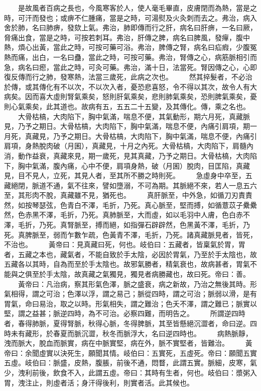 　　是故風者百病之長也，今風寒客於人，使人毫毛畢直，皮膚閉而為熱，當是之時，可汗而發也；或痹不仁腫痛，當是之時，可湯熨及火灸刺而去之。弗治，病入舍於肺，名曰肺痹，發欬上氣。弗治，肺即傳而行之肝，病名曰肝痹，一名曰厥，脅痛出食，當是之時，可按若刺耳。弗治，肝傳之脾，病名曰脾風，發癉，腹中熱，煩心出黃，當此之時，可按可藥可浴。弗治，脾傳之腎，病名曰疝瘕，少腹冤熱而痛，出白，一名曰蠱，當此之時，可按可藥。弗治，腎傳之心，病筋脈相引而急，病名曰瘛，當此之時，可灸可藥。弗治，滿十日，法當死。腎因傳之心，心即復反傳而行之肺，發寒熱，法當三歲死，此病之次也。
　　然其捽髮者，不必治於傳，或其傳化有不以次，不以次入者，憂恐悲喜怒，令不得以其次，故令人有大病矣。因而喜大虛則腎氣乘矣，怒則肝氣乘矣，悲則肺氣乘矣，恐則脾氣乘矣，憂則心氣乘矣，此其道也。故病有五，五五二十五變，及其傳化。傳，乘之名也。
　　大骨枯槁，大肉陷下，胸中氣滿，喘息不便，其氣動形，期六月死，真藏脈見，乃予之期日。大骨枯槁，大肉陷下，胸中氣滿，喘息不便，內痛引肩項，期一月死，真藏見，乃予之期日。大骨枯槁，大肉陷下，胸中氣滿，喘息不便，內痛引肩項，身熱脫肉破（月囷），真藏見，十月之內死。大骨枯槁，大肉陷下，肩髓內消，動作益衰，真藏來見，期一歲死，見其真藏，乃予之期日。大骨枯槁，大肉陷下，胸中氣滿，腹內痛，心中不便，肩項身熱，破（月囷）脫肉，目匡陷，真藏見，目不見人，立死，其見人者，至其所不勝之時則死。
　　急虛身中卒至，五藏絕閉，脈道不通，氣不往來，譬如墮溺，不可為期。其脈絕不來，若人一息五六至，其形肉不脫，真藏雖不見，猶死也。
　　真肝脈至，中外急，如循刀刃責責然，如按琴瑟弦，色青白不澤，毛折，乃死。真心脈至，堅而搏，如循薏苡子纍纍然，色赤黑不澤，毛折，乃死。真肺脈至，大而虛，如以毛羽中人膚，色白赤不澤，毛折，乃死。真腎脈至，搏而絕，如指彈石辟辟然，色黑黃不澤，毛折，乃死。真脾脈至，弱而乍數乍疏，色黃青不澤，毛折，乃死。諸真藏脈見者，皆死，不治也。
　　黃帝曰：見真藏曰死，何也。岐伯曰：五藏者，皆稟氣於胃，胃者，五藏之本也，藏氣者，不能自致於手太陰，必因於胃氣，乃至於手太陰也，故五藏各以其時，自為而至於手太陰也。故邪氣勝者，精氣衰也，故病甚者，胃氣不能與之俱至於手太陰，故真藏之氣獨見，獨見者病勝藏也，故曰死。帝曰：善。
　　黃帝曰：凡治病，察其形氣色澤，脈之盛衰，病之新故，乃治之無後其時。形氣相得，謂之可治；色澤以浮，謂之易己；脈從四時，謂之可治；脈弱以滑，是有胃氣，命曰易治，取之以時。形氣相失，謂之難治；色夭不澤，謂之難已；脈實以堅，謂之益甚；脈逆四時，為不可治。必察四難，而明告之。
　　所謂逆四時者，春得肺脈，夏得腎脈，秋得心脈，冬得脾脈，其至皆懸絕沉澀者，命曰逆。四時未有藏形，於春夏而脈沉澀，秋冬而脈浮大，名曰逆四時也。
　　病熱脈靜，洩而脈大，脫血而脈實，病在中脈實堅，病在外，脈不實堅者，皆難治。
　　黃帝曰：余聞虛實以決死生，願聞其情。岐伯曰：五實死，五虛死。帝曰：願聞五實五虛。岐伯曰：脈盛，皮熱，腹脹，前後不通，悶瞀，此謂五實。脈細，皮寒，氣少，洩利前後，飲食不入，此謂五虛。帝曰：其時有生者，何也。岐伯曰：漿粥入胃，洩注止，則虛者活；身汗得後利，則實者活。此其候也。


